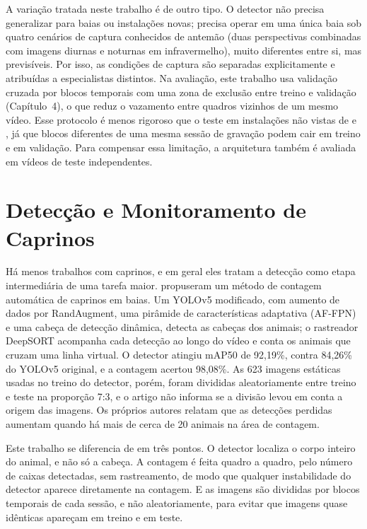 A variação tratada neste trabalho é de outro tipo. O detector não precisa generalizar para baias ou instalações novas; precisa operar em uma única baia sob quatro cenários de captura conhecidos de antemão (duas perspectivas combinadas com imagens diurnas e noturnas em infravermelho), muito diferentes entre si, mas previsíveis. Por isso, as condições de captura são separadas explicitamente e atribuídas a especialistas distintos. Na avaliação, este trabalho usa validação cruzada por blocos temporais com uma zona de exclusão entre treino e validação (Capítulo~4), o que reduz o vazamento entre quadros vizinhos de um mesmo vídeo. Esse protocolo é menos rigoroso que o teste em instalações não vistas de  e , já que blocos diferentes de uma mesma sessão de gravação podem cair em treino e em validação. Para compensar essa limitação, a arquitetura também é avaliada em vídeos de teste independentes.

\section{Detecção e Monitoramento de Caprinos}
\label{sec:deteccao-caprinos}

Há menos trabalhos com caprinos, e em geral eles tratam a detecção como etapa intermediária de uma tarefa maior.  propuseram um método de contagem automática de caprinos em baias. Um YOLOv5 modificado, com aumento de dados por RandAugment, uma pirâmide de características adaptativa (AF-FPN) e uma cabeça de detecção dinâmica, detecta as cabeças dos animais; o rastreador DeepSORT acompanha cada detecção ao longo do vídeo e conta os animais que cruzam uma linha virtual. O detector atingiu mAP50 de 92,19\%, contra 84,26\% do YOLOv5 original, e a contagem acertou 98,08\%. As 623 imagens estáticas usadas no treino do detector, porém, foram divididas aleatoriamente entre treino e teste na proporção 7:3, e o artigo não informa se a divisão levou em conta a origem das imagens. Os próprios autores relatam que as detecções perdidas aumentam quando há mais de cerca de 20 animais na área de contagem.

Este trabalho se diferencia de  em três pontos. O detector localiza o corpo inteiro do animal, e não só a cabeça. A contagem é feita quadro a quadro, pelo número de caixas detectadas, sem rastreamento, de modo que qualquer instabilidade do detector aparece diretamente na contagem. E as imagens são divididas por blocos temporais de cada sessão, e não aleatoriamente, para evitar que imagens quase idênticas apareçam em treino e em teste.

